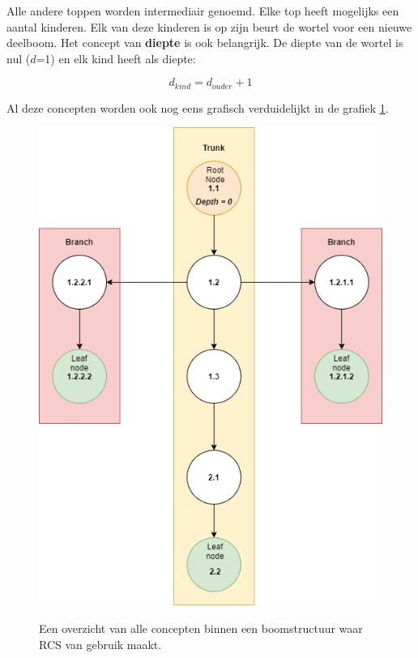 Alle andere toppen worden intermediair genoemd. Elke top heeft mogelijks een aantal kinderen. Elk van deze kinderen is op zijn beurt de wortel voor een nieuwe deelboom. Het concept van \textbf{diepte} is ook belangrijk. De diepte van de wortel is nul ($d$=1) en elk kind heeft als diepte: 

\begin{equation}
	d_{kind} = d_{ouder} + 1
\end{equation}

Al deze concepten worden ook nog eens grafisch verduidelijkt in de grafiek \ref{fig:tree}.

\begin{figure}[h!]
\centering
\includegraphics[scale=0.5]{tree1.png}
\label{fig:tree}
\caption[Overzicht concepten boomstructuur]{Een overzicht van alle concepten binnen een boomstructuur waar RCS van gebruik maakt.}
\end{figure}


